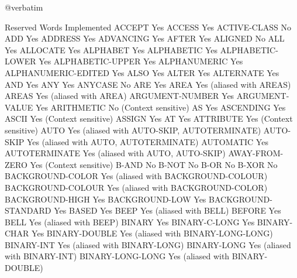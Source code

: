 @verbatim

Reserved Words                  Implemented
ACCEPT                          Yes
ACCESS                          Yes
ACTIVE-CLASS                    No
ADD                             Yes
ADDRESS                         Yes
ADVANCING                       Yes
AFTER                           Yes
ALIGNED                         No
ALL                             Yes
ALLOCATE                        Yes
ALPHABET                        Yes
ALPHABETIC                      Yes
ALPHABETIC-LOWER                Yes
ALPHABETIC-UPPER                Yes
ALPHANUMERIC                    Yes
ALPHANUMERIC-EDITED             Yes
ALSO                            Yes
ALTER                           Yes
ALTERNATE                       Yes
AND                             Yes
ANY                             Yes
ANYCASE                         No
ARE                             Yes
AREA                            Yes (aliased with AREAS)
AREAS                           Yes (aliased with AREA)
ARGUMENT-NUMBER                 Yes
ARGUMENT-VALUE                  Yes
ARITHMETIC                      No (Context sensitive)
AS                              Yes
ASCENDING                       Yes
ASCII                           Yes (Context sensitive)
ASSIGN                          Yes
AT                              Yes
ATTRIBUTE                       Yes (Context sensitive)
AUTO                            Yes (aliased with AUTO-SKIP, AUTOTERMINATE)
AUTO-SKIP                       Yes (aliased with AUTO, AUTOTERMINATE)
AUTOMATIC                       Yes
AUTOTERMINATE                   Yes (aliased with AUTO, AUTO-SKIP)
AWAY-FROM-ZERO                  Yes (Context sensitive)
B-AND                           No
B-NOT                           No
B-OR                            No
B-XOR                           No
BACKGROUND-COLOR                Yes (aliased with BACKGROUND-COLOUR)
BACKGROUND-COLOUR               Yes (aliased with BACKGROUND-COLOR)
BACKGROUND-HIGH                 Yes
BACKGROUND-LOW                  Yes
BACKGROUND-STANDARD             Yes
BASED                           Yes
BEEP                            Yes (aliased with BELL)
BEFORE                          Yes
BELL                            Yes (aliased with BEEP)
BINARY                          Yes
BINARY-C-LONG                   Yes
BINARY-CHAR                     Yes
BINARY-DOUBLE                   Yes (aliased with BINARY-LONG-LONG)
BINARY-INT                      Yes (aliased with BINARY-LONG)
BINARY-LONG                     Yes (aliased with BINARY-INT)
BINARY-LONG-LONG                Yes (aliased with BINARY-DOUBLE)

